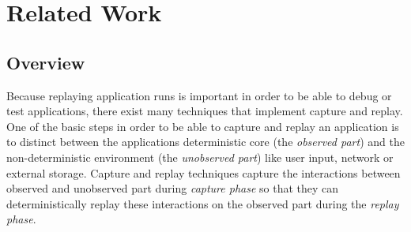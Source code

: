 \chapter{Related Work}
\section{Overview}
Because replaying application runs is important in order to be able to debug or test applications, there exist many techniques that implement capture and replay. One of the basic steps in order to be able to capture and replay an application is to distinct between the applications deterministic core (the \emph{observed part}) and the non-deterministic environment (the \emph{unobserved part}) like user input, network or external storage. Capture and replay techniques capture the interactions between observed and unobserved part during \emph{capture phase} so that they can deterministically replay these interactions on the observed part during the \emph{replay phase}.

% 

% 

